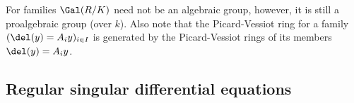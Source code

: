 \documentclass[a4paper, 11pt]{article}
\begin{document}
For families $\Gal(R/K)$ need not be an algebraic group, however, it is still a proalgebraic group (over $k$). Also note that the Picard-Vessiot ring for a family $(\del(y)=A_iy)_{i\in I}$ is generated by the Picard-Vessiot rings of its members $\del(y)=A_iy$. 


%	
%
%	

	
	\subsection{Regular singular differential equations} \label{subsec: Regular singular differential equations}
	
\end{document}
